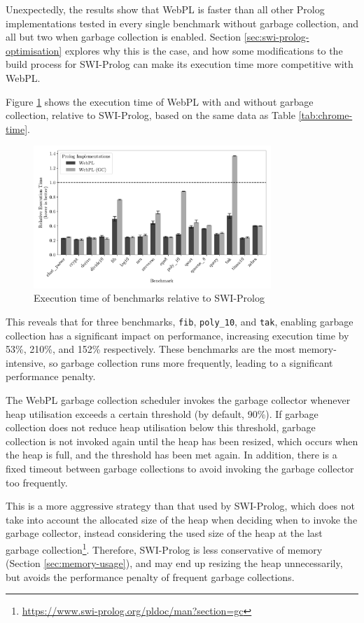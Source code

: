 Unexpectedly, the results show that WebPL is faster than all other Prolog implementations tested in every single benchmark without garbage collection, and all but two when garbage collection is enabled. Section \ref{sec:swi-prolog-optimisation} explores why this is the case, and how some modifications to the build process for SWI-Prolog can make its execution time more competitive with WebPL.

Figure \ref{fig:relative-performance} shows the execution time of WebPL with and without garbage collection, relative to SWI-Prolog, based on the same data as Table \ref{tab:chrome-time}.

\begin{figure}[H]
\centering
\includegraphics[width=0.8\textwidth]{relative_performance.pdf}
\caption{Execution time of benchmarks relative to SWI-Prolog}
\label{fig:relative-performance}
\end{figure}

This reveals that for three benchmarks, \texttt{fib}, \texttt{poly\_10}, and \texttt{tak}, enabling garbage collection has a significant impact on performance, increasing execution time by 53\%, 210\%, and 152\% respectively. These benchmarks are the most memory-intensive, so garbage collection runs more frequently, leading to a significant performance penalty.

The WebPL garbage collection scheduler invokes the garbage collector whenever heap utilisation exceeds a certain threshold (by default, 90\%). If garbage collection does not reduce heap utilisation below this threshold, garbage collection is not invoked again until the heap has been resized, which occurs when the heap is full, and the threshold has been met again. In addition, there is a fixed timeout between garbage collections to avoid invoking the garbage collector too frequently.

This is a more aggressive strategy than that used by SWI-Prolog, which does not take into account the allocated size of the heap when deciding when to invoke the garbage collector, instead considering the used size of the heap at the last garbage collection\footnote{\url{https://www.swi-prolog.org/pldoc/man?section=gc}}. Therefore, SWI-Prolog is less conservative of memory (Section \ref{sec:memory-usage}), and may end up resizing the heap unnecessarily, but avoids the performance penalty of frequent garbage collections.

